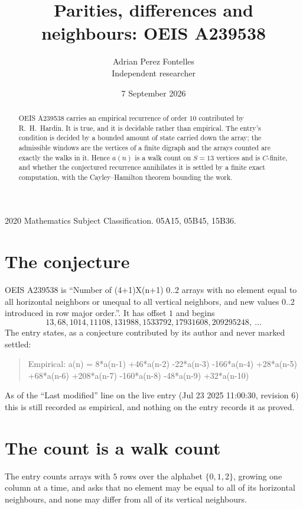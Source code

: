 \documentclass[11pt,a4paper]{article}
\title{Parities, differences and neighbours: OEIS A239538}
\author{Adrian Perez Fontelles\\ \small Independent researcher}
\date{7 September 2026}
\theoremstyle{plain}
\theoremstyle{definition}
\begin{document}
\maketitle

\begin{abstract}
OEIS A239538 carries an empirical recurrence of order $10$ contributed by R.~H.~Hardin. It is
true, and it is decidable rather than empirical. The entry's condition is decided by a bounded amount of state carried down the array; the
admissible windows are the vertices of a finite digraph and the arrays counted are exactly the
walks in it. Hence $a(n)$ is a walk count on $S=13$ vertices and is $C$-finite, and whether the
conjectured recurrence annihilates it is settled by a finite exact computation, with the
Cayley--Hamilton theorem bounding the work.
\end{abstract}

\noindent\small 2020 Mathematics Subject Classification. 05A15, 05B45, 15B36.\normalsize

\section{The conjecture}

OEIS A239538 is ``Number of (4+1)X(n+1) 0..2 arrays with no element equal to all horizontal neighbors or unequal to all vertical neighbors, and new values 0..2 introduced in row major order.''. It has offset $1$ and begins
\[
13, 68, 1014, 11108, 131988, 1533792, 17931608, 209295248,\ \dots
\]
The entry states, as a conjecture contributed by its author and never marked settled:
\begin{quote}
Empirical: a(n) = 8*a(n-1) +46*a(n-2) -22*a(n-3) -166*a(n-4) +28*a(n-5) +68*a(n-6) +208*a(n-7) -160*a(n-8) -48*a(n-9) +32*a(n-10)
\end{quote}
As of the ``Last modified'' line on the live entry (Jul 23 2025 11:00:30, revision 6) this is still
recorded as empirical, and nothing on the entry records it as proved.

\section{The count is a walk count}

The entry counts arrays with $5$ rows over the alphabet $\{0,1,2\}$, growing one column at a time, and asks that no element may be equal to all of its horizontal neighbours, and none may differ from all of its vertical neighbours.
\end{document}

